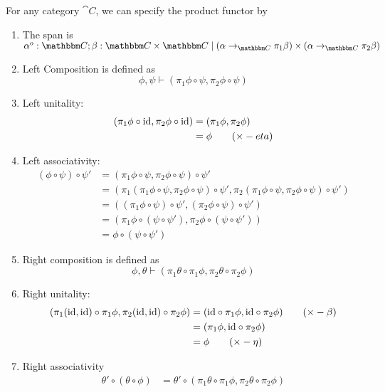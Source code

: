 \documentclass{article}
\begin{document}
\begin{definition}
  For any category $\cat C$, we can specify the product functor by
  \begin{enumerate}
  \item The span is $\alpha^o:\cat C; \beta : \cat C \times \cat C \pipe (\alpha \to_{\cat C} \pi_1 \beta) \times (\alpha \to_{\cat C} \pi_2 \beta)$
  \item Left Composition is defined as
    \[ \phi, \psi \vdash (\pi_1 \phi \circ \psi, \pi_2 \phi \circ \psi)\]
  \item Left unitality:
    \begin{align*}
      (\pi_1 \phi \circ \textrm{id}, \pi_2 \phi \circ \textrm{id})
      &= (\pi_1 \phi, \pi_2 \phi)\\
      &= \phi\tag{$\times-eta$}
    \end{align*}
  \item Left associativity:
    \begin{align*}
      (\phi \circ \psi) \circ \psi'
      &= (\pi_1 \phi \circ \psi, \pi_2 \phi \circ \psi) \circ \psi'\\
      &= (\pi_1 (\pi_1 \phi \circ \psi, \pi_2 \phi \circ \psi) \circ \psi',
      \pi_2 (\pi_1 \phi \circ \psi, \pi_2 \phi \circ \psi) \circ \psi')\\
      &= ((\pi_1 \phi \circ \psi) \circ \psi', (\pi_2 \phi \circ \psi) \circ \psi')\\
      &= (\pi_1 \phi \circ (\psi \circ \psi'), \pi_2 \phi \circ (\psi \circ \psi'))\\
      &= \phi \circ (\psi \circ \psi')
    \end{align*}
  \item Right composition is defined as
    \[ \phi, \theta \vdash (\pi_1 \theta \circ \pi_1 \phi, \pi_2 \theta \circ \pi_2 \phi) \]
  \item Right unitality:
    \begin{align*}
      (\pi_1 (\textrm{id},\textrm{id}) \circ \pi_1 \phi, \pi_2 (\textrm{id},\textrm{id}) \circ \pi_2 \phi)
      &= (\textrm{id} \circ \pi_1 \phi, \textrm{id} \circ \pi_2 \phi) \tag{$\times-\beta$}\\
      &= (\pi_1 \phi, \textrm{id} \circ \pi_2 \phi)\\
      &= \phi \tag{$\times-\eta$}
    \end{align*}
  \item Right associativity
    \begin{align*}
      \theta' \circ (\theta \circ \phi)
      &= \theta' \circ (\pi_1 \theta \circ \pi_1 \phi, \pi_2 \theta \circ \pi_2 \phi)\\

\end{align*}
\end{enumerate}
\end{definition}
\end{document}
